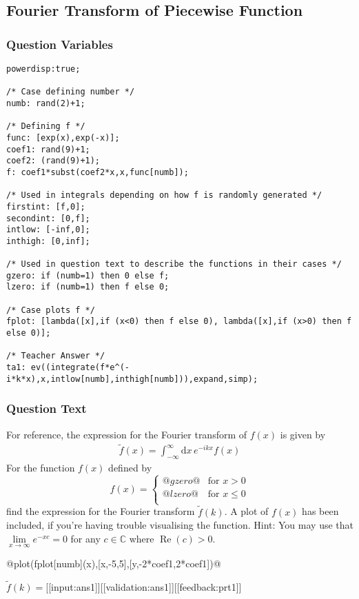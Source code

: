 \documentclass[a4paper,10pt]{article}
\begin{document}
\subsection{Fourier Transform of Piecewise Function}
\subsubsection{Question Variables}
\begin{lstlisting}
powerdisp:true;

/* Case defining number */
numb: rand(2)+1;

/* Defining f */
func: [exp(x),exp(-x)];
coef1: rand(9)+1;
coef2: (rand(9)+1);
f: coef1*subst(coef2*x,x,func[numb]);

/* Used in integrals depending on how f is randomly generated */
firstint: [f,0];
secondint: [0,f];
intlow: [-inf,0];
inthigh: [0,inf];

/* Used in question text to describe the functions in their cases */
gzero: if (numb=1) then 0 else f;
lzero: if (numb=1) then f else 0;

/* Case plots f */
fplot: [lambda([x],if (x<0) then f else 0), lambda([x],if (x>0) then f else 0)];

/* Teacher Answer */
ta1: ev((integrate(f*e^(-i*k*x),x,intlow[numb],inthigh[numb])),expand,simp);
\end{lstlisting}
\subsubsection{Question Text}
For reference, the expression for the Fourier transform of $f(x)$ is given by \begin{align*}
\tilde{f}(x) = \int_{-\infty}^{\infty} \text{d}x \, e^{-ikx}f(x)
\end{align*}For the function \(f(x)\) defined by \[ f(x) = \begin{cases} @gzero@ & \text{for } x>0\\ @lzero@ & \text{for } x\leq0 \\ \end{cases} \] find the expression for the Fourier transform \(\tilde{f}(k)\). A plot of \(f(x)\) has been included, if you're having trouble visualising the function. Hint: You may use that \(\underset{x \rightarrow \infty}\lim e^{-xc} = 0\) for any \(c \in \mathbb{C}\) where $\operatorname{Re}(c)>0$.

@plot(fplot[numb](x),[x,-5,5],[y,-2*coef1,2*coef1])@

\(\tilde{f}(k) = \)[[input:ans1]][[validation:ans1]][[feedback:prt1]]
\end{document}
